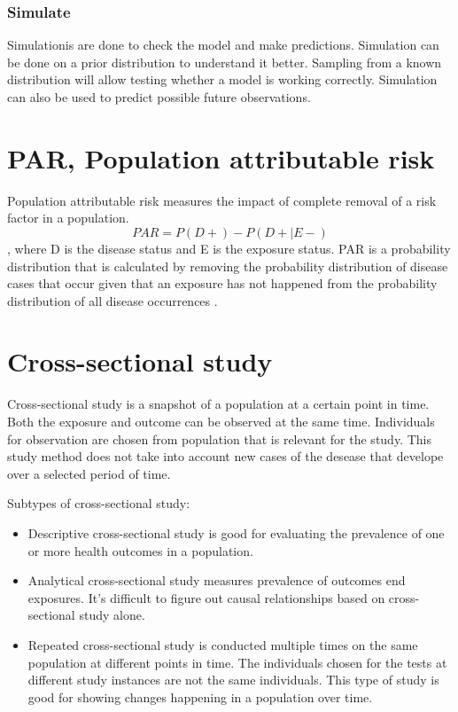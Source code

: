 \subsubsection*{Simulate}
Simulationis are done to check the model and make predictions. Simulation can be done on a prior distribution to understand it better. Sampling from a known distribution will allow testing whether a model is working correctly. Simulation can also be used to predict possible future observations. \cite{Mcelreath2015StatisticalRA}
\section{PAR, Population attributable risk}\label{PAR}
Population attributable risk measures the impact of complete removal of a risk factor in a population. 
\begin{equation} \label{PARequation}
PAR = P(D+) - P(D+| E-)
\end{equation}
, where D is the disease status and E is the exposure status. PAR is a probability distribution that is calculated by removing the probability distribution of disease cases that occur given that an exposure has not happened from the probability distribution of all disease occurrences . \cite{Pirikahu2016BayesianMO}
\section{Cross-sectional study}\label{CrossSectionalStudy}
Cross-sectional study is a snapshot of a population at a certain point in time. Both the exposure and outcome can be observed at the same time. Individuals for observation are chosen from population that is relevant for the study. This study method does not take into account new cases of the desease that develope over a selected period of time. 

Subtypes of cross-sectional study:
\begin{itemize}
    \item Descriptive cross-sectional study is good for evaluating the prevalence of one or more health outcomes in a population.
    \item Analytical cross-sectional study measures prevalence of outcomes end exposures.  It's difficult to figure out causal relationships based on cross-sectional study alone. 
    \item Repeated cross-sectional study is conducted multiple times on the same population at different points in time. The individuals chosen for the tests at different study instances are not the same individuals. This type of study is good for showing changes happening in a population over time.
\end{itemize}
\cite{Wang2020CrossSectionalSS} 

